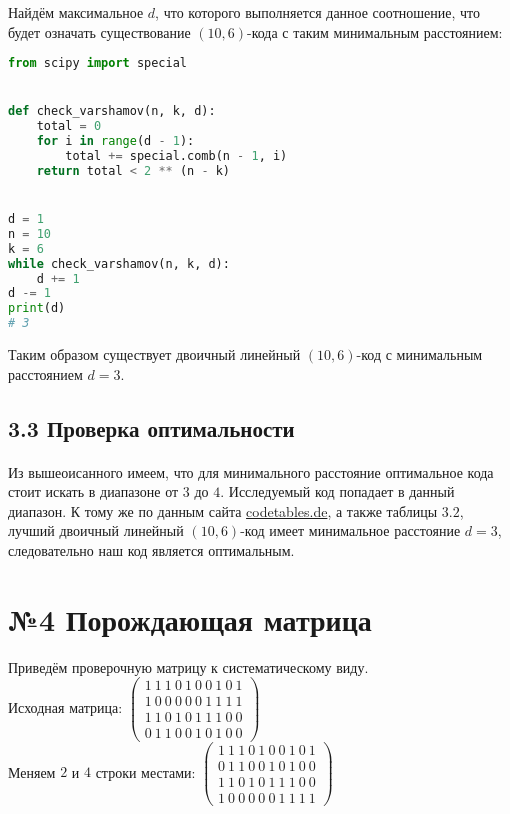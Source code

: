 \documentclass[fontsize=14pt]{article}
\begin{document}
Найдём максимальное $d$, что которого выполняется данное соотношение, что будет означать существование $(10, 6)$-кода с таким минимальным расстоянием:

\begin{lstlisting}[frame=single, language=Python]
from scipy import special


def check_varshamov(n, k, d):
    total = 0
    for i in range(d - 1):
        total += special.comb(n - 1, i)
    return total < 2 ** (n - k)


d = 1
n = 10
k = 6
while check_varshamov(n, k, d):
    d += 1
d -= 1
print(d)
# 3
\end{lstlisting}

Таким образом существует двоичный линейный $(10, 6)$-код с минимальным расстоянием $d = 3$.

\subsection*{3.3 Проверка оптимальности}

\paragraph*{}
Из вышеоисанного имеем, что для минимального расстояние оптимальное кода стоит искать в диапазоне от $3$ до $4$. Исследуемый код попадает в данный диапазон. К тому же по данным сайта \href{http://www.codetables.de}{codetables.de}, а также таблицы $3.2$, лучший двоичный линейный $(10, 6)$-код имеет минимальное расстояние $d = 3$, следовательно наш код является оптимальным. 
\section*{№4 Порождающая матрица}
	Приведём проверочную матрицу к систематическому виду.\\
	Исходная матрица: 
	$
	 \begin{pmatrix}
		1\ 1\ 1\ 0\ 1\ 0\ 0\ 1\ 0\ 1\\
		1\ 0\ 0\ 0\ 0\ 0\ 1\ 1\ 1\ 1\\
		1\ 1\ 0\ 1\ 0\ 1\ 1\ 1\ 0\ 0\\
		0\ 1\ 1\ 0\ 0\ 1\ 0\ 1\ 0\ 0
	\end{pmatrix}
	$\\
	
	Меняем $2$ и $4$ строки местами:
	 $
	 \begin{pmatrix}
		1\ 1\ 1\ 0\ 1\ 0\ 0\ 1\ 0\ 1\\
		0\ 1\ 1\ 0\ 0\ 1\ 0\ 1\ 0\ 0\\
		1\ 1\ 0\ 1\ 0\ 1\ 1\ 1\ 0\ 0\\
		1\ 0\ 0\ 0\ 0\ 0\ 1\ 1\ 1\ 1		
	\end{pmatrix}
	$\\
	
\end{document}
